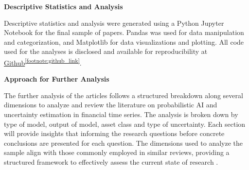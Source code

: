 \textbf{Descriptive Statistics and Analysis}\nopagebreak

Descriptive statistics and analysis were generated using a Python Jupyter Notebook for the final sample of papers. Pandas was used for data manipulation and categorization, and Matplotlib for data visualizations and plotting. All code used for the analyses is disclosed and available for reproducibility at \hyperlink{https://github.com/tjespe/literature-review/}{Github}\textsuperscript{\ref{footnote:github_link}}.

\textbf{Approach for Further Analysis}\nopagebreak

The further analysis of the articles follows a structured breakdown along several dimensions to analyze and review the literature on probabilistic AI and uncertainty estimation in financial time series. The analysis is broken down by type of model, output of model, asset class and type of uncertainty. Each section will provide insights that informing the research questions before concrete conclusions are presented for each question. The dimensions used to analyze the sample align with those commonly employed in similar reviews, providing a structured framework to effectively assess the current state of research \parencite{Blasco_et_al_2024}.

